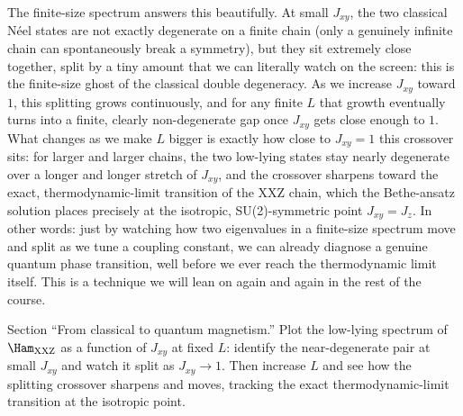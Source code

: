 \documentclass[all_sessions.tex]{subfiles}
\begin{document}
The finite-size spectrum answers this beautifully. At small $J_{xy}$, the two classical N\'eel states are
not exactly degenerate on a finite chain (only a genuinely infinite chain can spontaneously break a
symmetry), but they sit extremely close together, split by a tiny amount that we can literally watch on
the screen: this is the finite-size ghost of the classical double degeneracy. As we increase $J_{xy}$
toward $1$, this splitting grows continuously, and for any finite $L$ that growth eventually turns into a
finite, clearly non-degenerate gap once $J_{xy}$ gets close enough to $1$. What changes as we make $L$
bigger is exactly how close to $J_{xy}=1$ this crossover sits: for larger and larger chains, the two
low-lying states stay nearly degenerate over a longer and longer stretch of $J_{xy}$, and the crossover
sharpens toward the exact, thermodynamic-limit transition of the XXZ chain, which the Bethe-ansatz
solution places precisely at the isotropic, SU(2)-symmetric point $J_{xy}=J_z$. In other words: just by
watching how two eigenvalues in a finite-size spectrum move and split as we tune a coupling constant, we
can already diagnose a genuine quantum phase transition, well before we ever reach the thermodynamic
limit itself. This is a technique we will lean on again and again in the rest of the course.

\begin{notebook}
Section ``From classical to quantum magnetism.'' Plot the low-lying spectrum of
$\Ham_{\mathrm{XXZ}}$ as a function of $J_{xy}$ at fixed $L$: identify the near-degenerate pair at
small $J_{xy}$ and watch it split as $J_{xy}\to1$. Then increase $L$ and see how the splitting
crossover sharpens and moves, tracking the exact thermodynamic-limit transition at the isotropic
point.
\end{notebook}
\end{document}
